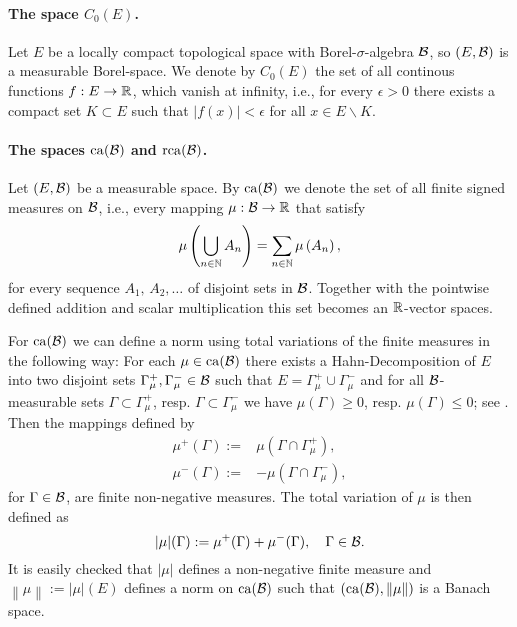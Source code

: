 \documentclass[../Master.tex]{subfiles}
\begin{document}
\paragraph{The space \(C_0(E)\).}
Let \(E\) be a locally compact topological space with Borel-\(\sigma{}\)-algebra \(\mathcal{B}\), so \((E,\mathcal{B})\) is a measurable Borel-space. We denote by \(C_0(E)\) the set of all continous functions \(f: E \to \mathbb{R} \), which vanish at infinity, i.e., for every \(\epsilon > 0\) there exists a compact set \(K \subset E\) such that \(\lvert f(x) \rvert < \epsilon \) for all \(x \in E \backslash K\). 


\paragraph{The spaces \(\mathrm{ca}(\mathcal{B})\) and \(\mathrm{rca}(\mathcal{B})\).}
Let \((E,\mathcal{B})\) be a measurable space. By \(\mathrm{ca} (\mathcal{B})\) we denote the set of all finite signed measures on \(\mathcal{B} \), i.e., every mapping \(\mu : \mathcal{B} \to \mathbb{R} \) that satisfy
\begin{equation*}
  \mu \left( \bigcup_{n \in \mathbb{N}} A_n \right)  = \sum_{n \in \mathbb{N}} \mu \left(A_n \right),
\end{equation*}
for every sequence \(A_1, \, A_2, \dots \) of disjoint sets in \(\mathcal{B}\).
Together with the pointwise defined addition and scalar multiplication this set becomes an \(\mathbb{R} \)-vector spaces.

For \(\mathrm{ca}(\mathcal{B})\) we can define a norm using total variations of the finite measures in the following way: For each \(\mu \in \mathrm{ca} (\mathcal{B}) \) there exists a Hahn-Decomposition of \(E\) into two disjoint sets \(\Gamma_\mu^+, \Gamma_\mu^- \in \mathcal{B} \) such that \(E = \Gamma_\mu^+ \cup \Gamma_\mu^-\) and for all \(\mathcal{B}\)-measurable sets \(\Gamma \subset \Gamma_\mu^+ \), resp. \(\Gamma \subset \Gamma_\mu^-\) we have \(\mu (\Gamma) \ge 0\), resp. \(\mu (\Gamma) \le 0\); see \cite[Theorem 32.1]{billingsley_probability_1995}. Then the mappings defined by
\begin{equation}
  \begin{aligned}
    \mu^+ (\Gamma) :=& \mu (\Gamma \cap \Gamma_\mu^+), \\
    \mu^- (\Gamma) :=& - \mu (\Gamma \cap \Gamma_\mu^-),
  \end{aligned}
\end{equation}
for \(\Gamma \in \mathcal{B}\), are finite non-negative measures. The total variation of \(\mu \) is then defined as
\begin{equation*}
  \lvert \mu \rvert (\Gamma) := \mu^+ (\Gamma) + \mu^- (\Gamma), \quad \Gamma \in \mathcal{B}.
\end{equation*}
It is easily checked that \(\lvert \mu \rvert{}\) defines a non-negative finite measure and \(\left\lVert \mu \right\rVert := \lvert \mu \rvert(E)\) defines a norm  on \(\mathrm{ca} (\mathcal{B})\) such that \((\mathrm{ca} (\mathcal{B}),\left\lVert \mu \right\rVert) \) is a Banach space.
\end{document}
